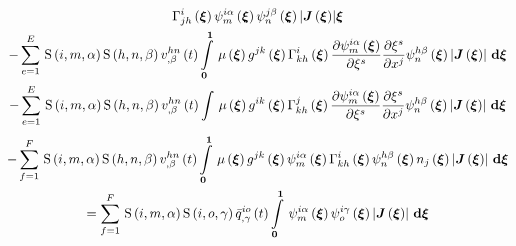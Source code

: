 \begin{multline}
{{      \fnof{\christoffel{i}{j}{h}}{\vectr{\xi}}\idxgbfn{i}{m}{\alpha}{\vectr{\xi}}
      \idxgbfn{j}{n}{\beta}{\vectr{\xi}}\abs{\fnof{\matr{J}}{\vectr{\xi}}}}{\vectr{\xi}}}\\
  -\gsum{e=1}{E}{\idxgsf{i}{m}{\alpha}\idxgsf{h}{n}{\beta}\fnof{\idxnodedof{v}{h}{n}{\beta}}{t}
    \gint{\vectr{0}}{\vectr{1}}{\fnof{\mu}{\vectr{\xi}}\fnof{g^{jk}}{\vectr{\xi}}\fnof{\christoffel{i}{k}{h}}{\vectr{\xi}}
      \delby{\idxgbfn{i}{m}{\alpha}{\vectr{\xi}}}{\xi^{s}}\delby{\xi^{s}}{x^{j}}
      \idxgbfn{h}{n}{\beta}{\vectr{\xi}}\abs{\fnof{\matr{J}}{\vectr{\xi}}}}{\vectr{\xi}}}\\
  -\gsum{e=1}{E}{\idxgsf{i}{m}{\alpha}\idxgsf{h}{n}{\beta}\fnof{\idxnodedof{v}{h}{n}{\beta}}{t}
    \gint{}{}{\fnof{\mu}{\vectr{\xi}}\fnof{g^{ik}}{\vectr{\xi}}\fnof{\christoffel{j}{k}{h}}{\vectr{\xi}}
      \delby{\idxgbfn{i}{m}{\alpha}{\vectr{\xi}}}{\xi^{s}}\delby{\xi^{s}}{x^{j}}
      \idxgbfn{h}{n}{\beta}{\vectr{\xi}}\abs{\fnof{\matr{J}}{\vectr{\xi}}}}{\vectr{\xi}}}\\
  -\gsum{f=1}{F}{\idxgsf{i}{m}{\alpha}\idxgsf{h}{n}{\beta}\fnof{\idxnodedof{v}{h}{n}{\beta}}{t}
    \gint{\vectr{0}}{\vectr{1}}{\fnof{\mu}{\vectr{\xi}}\fnof{g^{jk}}{\vectr{\xi}}\idxgbfn{i}{m}{\alpha}{\vectr{\xi}}
      \fnof{\christoffel{i}{k}{h}}{\vectr{\xi}}\idxgbfn{h}{n}{\beta}{\vectr{\xi}}\fnof{n_{j}}{\vectr{\xi}}
      \abs{\fnof{\matr{J}}{\vectr{\xi}}}}{\vectr{\xi}}}\\
  =\gsum{f=1}{F}{\idxgsf{i}{m}{\alpha}\idxgsf{i}{o}{\gamma}\fnof{\idxnodedof{\bar{q}}{i}{o}{\gamma}}{t}
    \gint{\vectr{0}}{\vectr{1}}{\idxgbfn{i}{m}{\alpha}{\vectr{\xi}}\idxgbfn{i}{o}{\gamma}{\vectr{\xi}}
      \abs{\fnof{\matr{J}}{\vectr{\xi}}}}{\vectr{\xi}}}\\
  \label{eqn:FEM4StokesEquation}
\end{multline}
